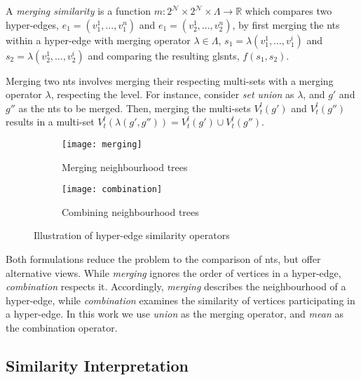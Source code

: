 \begin{definition}
A \textit{merging similarity} is a function $m: 2^{\mathcal{N}} \times 2^{\mathcal{N}} \times \Lambda \rightarrow \mathbb{R}$ which compares two hyper-edges, $e_1 = (v_1^1,..., v_1^n)$ and $e_1 = (v_2^1,..., v_2^n)$, by first merging the \gls{nt}s within a hyper-edge with merging operator $\lambda \in \Lambda$, $s_1 = \lambda (v_1^1,\ldots,v_1^i)$ and $s_2 = \lambda (v_2^1,\ldots,v_2^i)$ and comparing the resulting gls{nt}s, $f(s_1,s_2)$.
\end{definition}


Merging two \gls{nt}s involves merging their respecting multi-sets with a merging operator $\lambda$, respecting the level.
For instance, consider \textit{set union} as $\lambda$, and $g'$ and $g''$ as the \gls{nt}s to be merged.
Then, merging the multi-sets $V^l_{t}(g')$ and $V^l_{t}(g'')$ results in a multi-set $V^l_{t}\left(\lambda(g',g'')\right) = V^l_{t}(g') \cup V^l_{t}(g'')$.


\begin{figure}
	\centering
	\begin{subfigure}{\linewidth}
		\centering
		\texttt{[image: merging]}
		\caption{Merging neighbourhood trees\label{fig:ntmerging}}
	\end{subfigure}

	\begin{subfigure}{\linewidth}
		\centering
		\texttt{[image: combination]}
		\caption{Combining neighbourhood trees\label{fig:ntcombination}}
	\end{subfigure}
	\caption{Illustration of hyper-edge similarity operators}
\end{figure}


Both formulations reduce the problem to the comparison of \gls{nt}s, but offer alternative views.
While \textit{merging} ignores the order of vertices in a hyper-edge, \textit{combination} respects it.
Accordingly, \textit{merging} describes the neighbourhood of a hyper-edge, while \textit{combination} examines the similarity of vertices participating in a hyper-edge.
In this work we use \textit{union} as the merging operator, and \textit{mean} as the combination operator.



\subsection{Similarity Interpretation}

